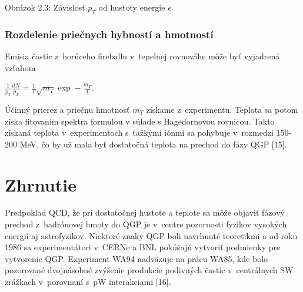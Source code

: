 \vspace*{6cm}
\hspace*{-2.3cm}

\vspace*{-8cm}
\begin{center}
  Obrázok 2.3: Závislosť $p_{T}$ od hustoty energie $\epsilon$.
\end{center}

\subsubsection{Rozdelenie priečnych hybností a hmotností}
Emisia častíc z~horúceho fireballu v~tepelnej rovnováhe
môže byť vyjadrená  vzťahom
\begin{center}
  $\frac{1}{p_{T}}\frac{dN}{p_{T}} =
  \frac{1}{T}\sqrt{m_{T}}\exp-\frac{m_{T}}{T}$.
\end{center}
Účinný prierez a priečnu hmotnosť $m_{T}$ získame
z~experimentu. Teplota sa potom získa fitovaním spektra formulou v
súlade s Hagedornovou rovnicou. Takto získaná teplota v~experimentoch
s~ťažkými iónmi sa pohybuje v~rozmedzi 150-200 MeV, čo by
už mala byť dostatočná teplota na prechod do fázy QGP [15].

\section{Zhrnutie}
Predpoklad QCD, že pri dostatočnej hustote a teplote sa môže
objaviť fázový prechod z~hadrónovej hmoty do QGP je v~centre
pozornosti fyzikov vysokých energií aj astrofyzikov. Niektoré znaky QGP boli
navrhnuté teoretikmi a od roku 1986 sa experimentátori v~CERNe a BNL
pokúšajú vytvoriť  podmienky pre vytvorenie QGP. Experiment
WA94 nadväzuje na prácu WA85, kde bolo pozorované dvojnásobné
zvýšenie produkcie podivných častíc v~centrálnych SW
zrážkach  v~porovnaní s~pW interakciami [16].
